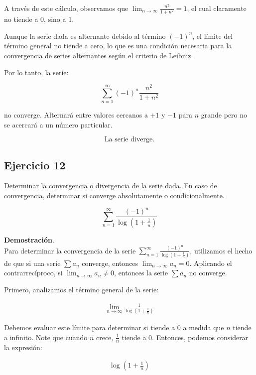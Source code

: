\documentclass{article}
\begin{document}
    A través de este cálculo, observamos que \(\lim_{n \rightarrow \infty} \frac{n^{2}}{1+n^{2}} = 1\), el cual claramente no tiende a 0, sino a 1.

    Aunque la serie dada es alternante debido al término \( (-1)^n \), el límite del término general no tiende a cero, lo que es una condición necesaria para la convergencia de series alternantes según el criterio de Leibniz.

    Por lo tanto, la serie:

    \[
    \sum_{n=1}^{\infty}(-1)^{n} \frac{n^{2}}{1+n^{2}}
    \]

    no converge. Alternará entre valores cercanos a \(+1\) y \(-1\) para \(n\) grande pero no se acercará a un número particular.

    \[
    \text{La serie diverge.}
    \]

    \subsection*{Ejercicio 12}

    Determinar la convergencia o divergencia de la serie dada. En caso de convergencia, determinar si converge absolutamente o condicionalmente.

    $$
    \sum_{n=1}^{\infty} \frac{(-1)^{n}}{\log \left(1+\frac{1}{n}\right)}
    $$

    \textbf{Demostración}.\\

    Para determinar la convergencia de la serie $\sum_{n=1}^{\infty} \frac{(-1)^{n}}{\log \left(1+\frac{1}{n}\right)}$, utilizamos el hecho de que si una serie $\sum a_{n}$ converge, entonces $\lim _{n \rightarrow \infty} a_{n}=0$. Aplicando el contrarrecíproco, si $\lim _{n \rightarrow \infty} a_{n} \neq 0$, entonces la serie $\sum a_{n}$ no converge.

    Primero, analizamos el término general de la serie:

    \begin{align*}
    \lim _{n \rightarrow \infty} \frac{1}{\log \left(1+\frac{1}{n}\right)}
    \end{align*}

    Debemos evaluar este límite para determinar si tiende a 0 a medida que \( n \) tiende a infinito. Note que cuando \( n \) crece, \( \frac{1}{n} \) tiende a 0. Entonces, podemos considerar la expresión:

    \begin{align*}
    \log \left(1+\frac{1}{n}\right)
    \end{align*}
\end{document}
